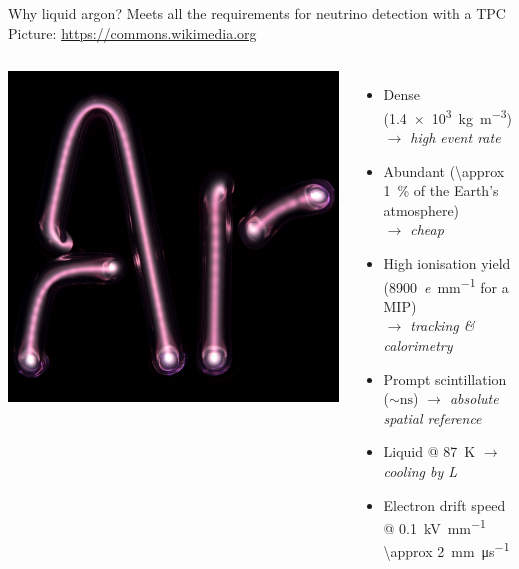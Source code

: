 \documentclass[]{beamer}
\newcommand*{\emphcoltitle}{blue}
\begin{document}
\begin{frame}{Why liquid argon?}{\color{\emphcoltitle} Meets all the requirements for neutrino detection with a TPC}
	{\tiny Picture: \url{https://commons.wikimedia.org}}
	\begin{columns}[c]
		\centering
		\includegraphics[width=\textwidth]{defence/ArTube}\\
		\begin{itemize}
			\item Dense (\SI{1.4e3}{\kilo\gram\per\cubic\metre}) \emph{$\rightarrow$ high event rate}
			\item Abundant (\SI{\approx 1}{\percent} of the Earth's atmosphere) \\ \emph{$\rightarrow$ cheap}
			\item High ionisation yield (\SI{8900}{\elementarycharge\per\milli\metre} for a MIP) \\ \emph{$\rightarrow$ tracking \& calorimetry}
			\item Prompt scintillation ($\sim \si{\nano\second}$) \emph{$\rightarrow$ absolute spatial reference}
			\item Liquid @ \SI{87}{\kelvin} \emph{$\rightarrow$ cooling by L}
			\item Electron drift speed @ \SI{0.1}{\kilo\volt\per\milli\meter} \SI{\approx 2}{\milli\meter\per\micro\second}
		\end{itemize}
	\end{columns}
\end{frame}
\end{document}
